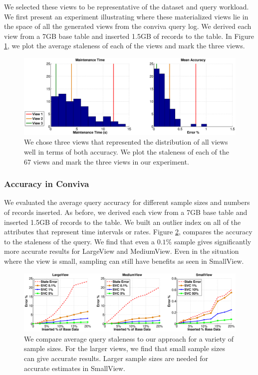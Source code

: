 We selected these views to be representative of the dataset and query workload. 
We first present an experiment illustrating where these materialized views lie in the space of all the generated views from the conviva query log.
We derived each view from a 7GB base table and inserted 1.5GB of records to the table. 
In Figure \ref{exp12conviva}, we plot the average staleness of each of the views and mark the three views.
\begin{figure}[ht!]
\label{exp12conviva}
\centering
\includegraphics[scale=0.25]{exp/conviva_efficiency_accuracy.eps}
 \caption{We chose three views that represented the distribution of all views well in terms of both accuracy. We plot the staleness of each of the 67 views and mark the three views in our experiment.}
\end{figure}

\subsubsection{Accuracy in Conviva}
We evaluated the average query accuracy for different sample sizes and numbers of records inserted.
As before, we derived each view from a 7GB base table and inserted 1.5GB of records to the table. 
We built an outlier index on all of the attributes that represent time intervals or rates.
Figure \ref{exp5conviva}, compares the accuracy to the staleness of the query.
We find that even a $0.1\%$ sample gives significantly more accurate results for LargeView and MediumView.
Even in the situation where the view is small, sampling can still have benefits as seen in SmallView.

\begin{figure}[ht!]
\label{exp5conviva}
\hspace{-3.5em}
\includegraphics[scale=0.22]{exp/exp5-coniva-accuracy.eps}
 \caption{We compare average query staleness to our approach for a variety of sample sizes. For the larger views, we find that small sample sizes can give accurate results. Larger sample sizes are needed for accurate estimates in SmallView.}
\end{figure}

